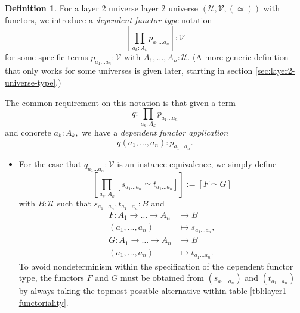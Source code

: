 \documentclass[a4paper]{article}
\theoremstyle{definition}
\newtheorem{definition}{Definition}[section]
\theoremstyle{remark}
\newcommand{\defn}{\emph}
\renewcommand{\equiv}{\simeq}
\newcommand{\U}{\mathcal{U}}
\newcommand{\V}{\mathcal{V}}
\begin{document}
\begin{definition}
  \label{def:layer2-dependent-functor-type}
  For a layer 2 universe layer 2 universe $(\U,\V,(\equiv))$ with functors, we introduce a
  \defn{dependent functor type} notation
  \[\left[\prod_{a_k : A_k} p_{a_1 \dots a_n}\right] : \V\]
  for some specific terms $p_{a_1 \dots a_n} : \V$ with $A_1,\dots,A_n : \U.$
  (A more generic definition that only works for some universes is given later, starting in section
  \ref{sec:layer2-universe-type}.)

  The common requirement on this notation is that given a term
  \[q : \prod_{a_k : A_k} p_{a_1 \dots a_n}\]
  and concrete $a_k : A_k,$ we have a \defn{dependent functor application}
  \[q(a_1,\dots,a_n) : p_{a_1 \dots a_n}.\]

  \begin{itemize}
    \item For the case that $q_{a_1 \dots a_n} : \V$ is an instance equivalence, we simply define
    \[\left[\prod_{a_k : A_k} [s_{a_1 \dots a_n} \equiv t_{a_1 \dots a_n}]\right] := [F \equiv G]\]
    with $B : \U$ such that $s_{a_1 \dots a_n},t_{a_1 \dots a_n} : B$ and
    \begin{align*}
      F : A_1 \to \dots \to A_n &\to     B\\
          (a_1,\dots,a_n)       &\mapsto s_{a_1 \dots a_n},\\[1ex]
      G : A_1 \to \dots \to A_n &\to     B\\
          (a_1,\dots,a_n)       &\mapsto t_{a_1 \dots a_n}.
    \end{align*}
    To avoid nondeterminism within the specification of the dependent functor type, the functors $F$
    and $G$ must be obtained from $(s_{a_1 \dots a_n})$ and $(t_{a_1 \dots a_n})$ by always taking
    the topmost possible alternative within table \ref{tbl:layer1-functoriality}.


\end{itemize}
\end{definition}
\end{document}
